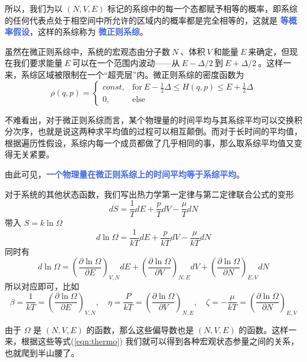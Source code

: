 \documentclass[hyperref,UTF-8]{ctexbook}
\newcommand{\0}{\boldsymbol{0}}
\begin{document}
所以，我们为以 $(N,V,E)$ 标记的系综中的每一个态都赋予相等的概率，即系综的任何代表点处于相空间中所允许的区域内的概率都是完全相等的，这就是 \textcolor{RoyalBlue}{\textbf{\kaishu 等概率假设}}，这样的系综称为 \textcolor{RoyalBlue}{\textbf{\kaishu 微正则系综}}。

虽然在微正则系综中，系统的宏观态由分子数$~N~$、体积$~V~$和能量$~E~$来确定，但现在我们要求能量$~E~$可以在一个范围内波动——从$~E -\Delta/2~$到$~E + \Delta/2~$。这样一来，系综区域被限制在一个“超壳层”内。微正则系综的密度函数为
\begin{equation}
\rho(q, p) = \begin{cases}const, & \text{for}~E - \displaystyle\frac{1}{2}\Delta \le H(q, p) \le E + \displaystyle\frac{1}{2}\Delta \\
0, &\text{else}
\end{cases}
\end{equation}

不难看出，对于微正则系综而言，某个物理量的时间平均与其系综平均可以交换积分次序，也就是说这两种求平均值的过程可以相互颠倒。而对于长时间的平均值，根据遍历性假设，系综内每一个成员都做了几乎相同的事，那么取系综平均值又变得无关紧要\cite{Pathria}。

由此可见，\textcolor{RoyalBlue}{\textbf{\kaishu 一个物理量在微正则系综上的时间平均等于系综平均}}。

对于系统的其他状态函数，我们写出热力学第一定律与第二定律联合公式的变形
\[
    dS = \frac{1}{T} dE + \frac{p}{T} dV - \frac{\mu}{T} dN
\]
带入 $S = k \ln \Omega$ 
\begin{equation}
    d\ln \Omega = \frac{1}{kT} dE + \frac{p}{kT} dV - \frac{\mu}{kT} dN
\end{equation}
同时有
\begin{equation}
    d\ln \Omega = \left(\frac{\partial \ln \Omega}{\partial E}\right)_{V,N} dE + \left(\frac{\partial \ln \Omega}{\partial V}\right)_{N,E} dV + \left(\frac{\partial \ln \Omega}{\partial N}\right)_{E,V} dN
\end{equation}
所以对应即可，比如
\begin{equation}\label{eqn:thermo}
    \beta = \frac{1}{kT} =  \left(\frac{\partial \ln \Omega}{\partial E}\right)_{V,N},\quad \eta  = \frac{P}{kT}  = \left(\frac{\partial \ln \Omega}{\partial V}\right)_{N,E},\quad \zeta = -\frac{\mu}{kT}  = \left(\frac{\partial \ln \Omega}{\partial N}\right)_{E,V}
\end{equation}

由于 $\Omega$ 是 $(N,V,E)$ 的函数，那么这些偏导数也是 $(N,V,E)$ 的函数。这样一来，根据这些等式(\ref*{eqn:thermo}) 我们就可以得到各种宏观状态参量之间的关系，也就爬到半山腰了。
\end{document}
